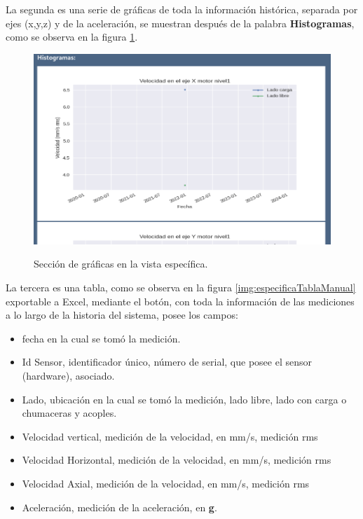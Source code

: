 \documentclass[12pt]{article}
\begin{document}
La segunda es una serie de gráficas de toda la información histórica, separada
por ejes (x,y,z) y de la aceleración, se muestran después de la palabra
\textbf{Histogramas}, como se observa en la figura \ref{img:especificaGraficasManual}.

    \begin{figure}[H]
		\centering
        \caption{Sección de gráficas en la vista específica. }
        \includegraphics[width=\linewidth]{ManualUsuario/especificaGraficas.png}
        \label{img:especificaGraficasManual}
	\end{figure}

La tercera es una tabla, como se observa en la figura \ref{img:especificaTablaManual}
exportable a Excel, mediante el botón, con toda la información de las mediciones
a lo largo de la historia del sistema, posee los campos:
\begin{itemize}
    \item fecha en la cual se tomó la medición.
    \item Id Sensor, identificador único, número de serial, que posee el sensor
        (hardware), asociado.
    \item Lado, ubicación en la cual se tomó la medición, lado libre, lado con
        carga o chumaceras y acoples.
    \item Velocidad vertical, medición de la velocidad, en mm/s, medición rms
    \item Velocidad Horizontal, medición de la velocidad, en mm/s, medición rms
    \item Velocidad Axial, medición de la velocidad, en mm/s, medición rms
    \item Aceleración, medición de la aceleración, en \textbf{g}.
\end{itemize}
\end{document}
